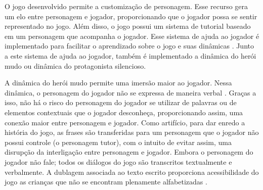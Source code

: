 \vspace{-0.1cm}

O jogo desenvolvido permite a customização de personagem. Esse recurso gera um elo entre personagem e jogador, proporcionando que o jogador possa se sentir representado no jogo. Além disso, o jogo possui um sistema de tutorial baseado em um personagem que acompanha o jogador. Esse sistema de ajuda ao jogador é implementado para facilitar o aprendizado sobre o jogo e suas dinâmicas \cite{buchinger2014sherlock}. Junto a este sistema de ajuda ao jogador, também é implementado a dinâmica do herói mudo ou dinâmica do protagonista silencioso. 

\vspace{-0.1cm}

A dinâmica do herói mudo permite uma imersão maior ao jogador. Nessa dinâmica, o personagem do jogador não se expressa de maneira verbal \cite{domsch2017dialogue}. Graças a isso, não há o risco do personagem do jogador se utilizar de palavras ou de elementos contextuais que o jogador desconheça, proporcionando assim, uma conexão maior entre personagem e jogador. Como artifício, para dar enredo a história do jogo, as frases são transferidas para um personagem que o jogador não possui controle (o personagem tutor), com o intuito de evitar assim, uma disrupção da interligação entre personagem e jogador. Embora o personagem do jogador não fale; todos os diálogos do jogo são transcritos textualmente e verbalmente. A dublagem associada ao texto escrito proporciona acessibilidade do jogo as crianças que não se encontram plenamente alfabetizadas \cite{limeira2015avaliaccao}. 

\vspace{-0.1cm}


